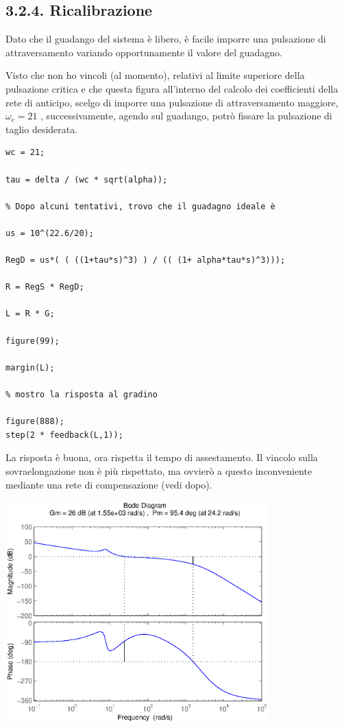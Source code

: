 \documentclass{article}
\begin{document}
\subsection*{3.2.4. Ricalibrazione}

\begin{par}
Dato che il guadango del sistema è libero, è facile imporre una pulsazione
di attraversamento variando opportunamente il valore del guadagno.

Visto che non ho vincoli (al momento), relativi al limite superiore della pulsazione critica e
che questa figura all'interno del calcolo dei coefficienti della rete di
anticipo, scelgo di imporre una pulsazione di attraversamento maggiore, $ \omega_c  = 21 $ , successivamente, agendo sul guadango, potrò fissare la pulsazione di taglio desiderata.
\end{par}
\begin{verbatim}
wc = 21;

tau = delta / (wc * sqrt(alpha));

% Dopo alcuni tentativi, trovo che il guadagno ideale è

us = 10^(22.6/20);

RegD = us*( ( ((1+tau*s)^3) ) / (( (1+ alpha*tau*s)^3)));

R = RegS * RegD;

L = R * G;

figure(99);

margin(L);

% mostro la risposta al gradino

figure(888);
step(2 * feedback(L,1));
\end{verbatim}
\begin{par}
La risposta è buona, ora rispetta il tempo di assestamento.
Il vincolo sulla sovraelongazione non è più rispettato, ma ovvierò a questo inconveniente mediante una rete di compensazione (vedi dopo).
\end{par}

\includegraphics [width=4in]{prog6RADICI_11.eps}
\end{document}
